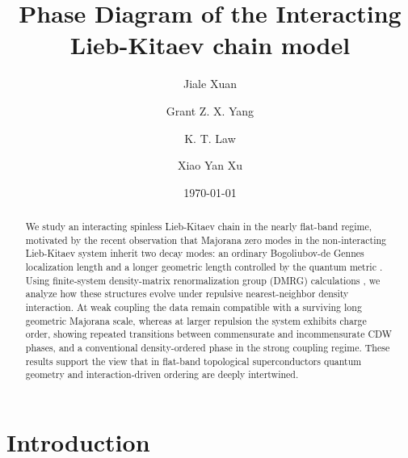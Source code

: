 \documentclass[
  prb,
  reprint,
  superscriptaddress,
  amsmath,
  amssymb,
  longbibliography
]{revtex4-2}
\begin{document}
\title{Phase Diagram of the Interacting Lieb-Kitaev chain model}

\author{Jiale Xuan}
\author{Grant Z. X. Yang}
\author{K. T. Law}
\author{Xiao Yan Xu}

\date{\today}

\begin{abstract}
We study an interacting spinless Lieb-Kitaev chain in the nearly flat-band regime, motivated by the recent observation that Majorana zero modes in the non-interacting Lieb-Kitaev system inherit two decay modes: an ordinary Bogoliubov-de Gennes localization length and a longer geometric length controlled by the quantum metric . Using finite-system density-matrix renormalization group (DMRG) calculations , we analyze how these structures evolve under repulsive nearest-neighbor density interaction. At weak coupling the data remain compatible with a surviving long geometric Majorana scale, whereas at larger repulsion the system exhibits charge order, showing repeated transitions between commensurate and incommensurate CDW phases, and a conventional density-ordered phase in the strong coupling regime. These results support the view that in flat-band topological superconductors quantum geometry and interaction-driven ordering are deeply intertwined.
\end{abstract}

\maketitle

\section{Introduction}
\end{document}

